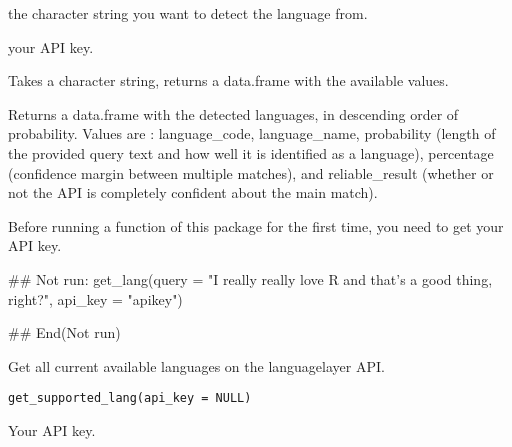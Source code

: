 \documentclass[a4paper]{book}
\begin{document}
%
\begin{Arguments}
\begin{ldescription}
\item[\code{query}] the character string you want to detect the language from.

\item[\code{api\_key}] your API key.
\end{ldescription}
\end{Arguments}
%
\begin{Details}\relax
Takes a character string, returns a data.frame with the available values.
\end{Details}
%
\begin{Value}
Returns a data.frame with the detected languages, in descending order of probability. Values are : language\_code, language\_name, probability (length of the provided query text and how well it is identified as a language), percentage (confidence margin between multiple matches), and reliable\_result (whether or not the API is completely confident about the main match).
\end{Value}
%
\begin{Note}\relax
Before running a function of this package for the first time, you need to get your API key.
\end{Note}
%
\begin{Examples}
\begin{ExampleCode}
## Not run: 
get_lang(query = "I really really love R and that's a good thing, right?", api_key = "apikey")

## End(Not run)
\end{ExampleCode}
\end{Examples}
%
\begin{Description}\relax
Get all current available languages on the languagelayer API.
\end{Description}
%
\begin{Usage}
\begin{verbatim}
get_supported_lang(api_key = NULL)
\end{verbatim}
\end{Usage}
%
\begin{Arguments}
\begin{ldescription}
\item[\code{api\_key}] Your API key.
\end{ldescription}
\end{Arguments}
\end{document}
